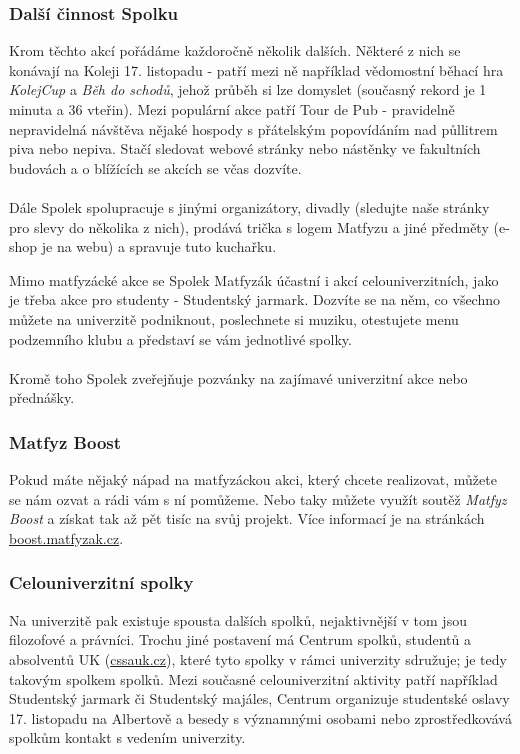 \subsubsection{Další činnost Spolku}
Krom těchto akcí pořádáme každoročně několik dalších. Některé z nich se konávají
na Koleji 17. listopadu - patří mezi ně například vědomostní běhací hra
\textit{KolejCup} a \textit{Běh do schodů}, jehož průběh si lze domyslet
(současný rekord je 1 minuta a 36 vteřin). Mezi populární akce patří Tour de Pub
- pravidelně nepravidelná návštěva nějaké hospody s přátelským popovídáním nad
půllitrem piva nebo nepiva. Stačí sledovat webové stránky nebo nástěnky ve
fakultních budovách a o blížících se akcích se včas dozvíte.
\\\\
Dále Spolek spolupracuje s jinými organizátory, divadly (sledujte naše stránky
pro slevy do několika z nich), prodává trička s logem Matfyzu a jiné předměty
(e-shop je na webu) a spravuje tuto kuchařku.

Mimo matfyzácké akce se Spolek Matfyzák účastní i akcí celouniverzitních, jako
je třeba akce pro studenty - Studentský jarmark. Dozvíte se na něm, co všechno
můžete na univerzitě podniknout, poslechnete si muziku, otestujete menu
podzemního klubu a představí se vám jednotlivé spolky.
\\\\
Kromě toho Spolek zveřejňuje pozvánky na zajímavé univerzitní akce nebo
přednášky.


\subsubsection{Matfyz Boost}
Pokud máte nějaký nápad na matfyzáckou akci, který chcete realizovat, můžete se
nám ozvat a rádi vám s ní pomůžeme. Nebo taky můžete využít soutěž
\textit{Matfyz Boost} a získat tak až pět tisíc na svůj projekt. Více informací
je na stránkách \url{boost.matfyzak.cz}.


\subsubsection{Celouniverzitní spolky}
Na univerzitě pak existuje spousta dalších spolků, nejaktivnější v tom jsou
filozofové a právníci. Trochu jiné postavení má Centrum spolků, studentů a
absolventů UK (\url{cssauk.cz}), které tyto spolky v rámci univerzity sdružuje;
je tedy takovým spolkem spolků. Mezi současné celouniverzitní aktivity patří
například Studentský jarmark či Studentský majáles, Centrum organizuje
studentské oslavy 17. listopadu na Albertově a besedy s významnými osobami nebo
zprostředkovává spolkům kontakt s vedením univerzity.